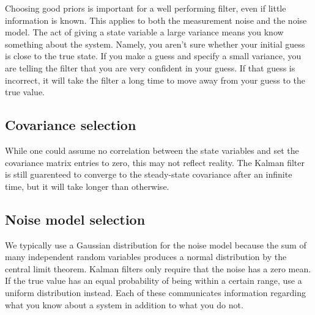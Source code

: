 Choosing good priors is important for a well performing filter, even if little
information is known. This applies to both the measurement noise and the noise
\gls{model}. The act of giving a state variable a large variance means you know
something about the system. Namely, you aren't sure whether your initial guess
is close to the true state. If you make a guess and specify a small variance,
you are telling the filter that you are very confident in your guess. If that
guess is incorrect, it will take the filter a long time to move away from your
guess to the true value.

\subsection{Covariance selection}

While one could assume no correlation between the state variables and set the
covariance matrix entries to zero, this may not reflect reality. The Kalman
filter is still guarenteed to converge to the steady-state covariance after an
infinite time, but it will take longer than otherwise.

\subsection{Noise model selection}

We typically use a Gaussian distribution for the noise \gls{model} because the
sum of many independent random variables produces a normal distribution by the
central limit theorem. Kalman filters only require that the noise has a zero
mean. If the true value has an equal probability of being within a certain
range, use a uniform distribution instead. Each of these communicates
information regarding what you know about a system in addition to what you do
not.
